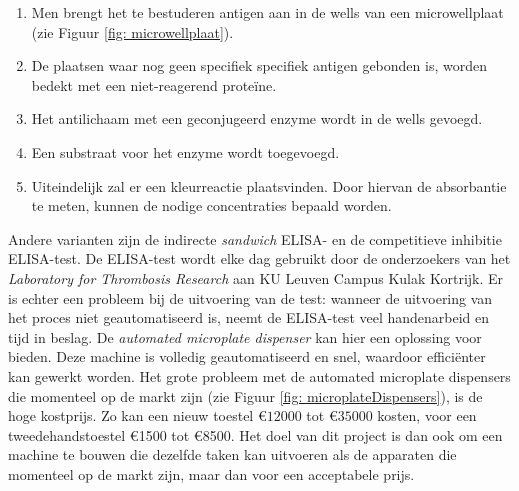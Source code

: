 \documentclass[a4paper,twoside,kulak]{kulakreport} %
\begin{document}
\begin{enumerate}
	\item Men brengt het te bestuderen antigen aan in de wells van een microwellplaat (zie Figuur \ref{fig: microwellplaat}).
	\item De plaatsen waar nog geen specifiek specifiek antigen gebonden is, worden bedekt met een niet-reagerend proteïne.
	\item Het antilichaam met een geconjugeerd enzyme wordt in de wells gevoegd.
	\item Een substraat voor het enzyme wordt toegevoegd. 
	\item Uiteindelijk zal er een kleurreactie plaatsvinden. Door hiervan de absorbantie te meten, kunnen de nodige concentraties bepaald worden. 
\end{enumerate}
Andere varianten zijn de indirecte \textit{sandwich} ELISA- en de competitieve inhibitie ELISA-test\cite{soortenELISA1}\cite{soortenELISA2}\cite{soortenELISA3}.
De ELISA-test wordt elke dag gebruikt door de onderzoekers van het \textit{Laboratory for Thrombosis Research} aan KU Leuven Campus Kulak Kortrijk. Er is echter een probleem bij de uitvoering van de test: wanneer de uitvoering van het proces niet geautomatiseerd is, neemt de ELISA-test veel handenarbeid en tijd in beslag. De \textit{automated microplate dispenser} kan hier een oplossing voor bieden. Deze machine is volledig geautomatiseerd en snel, waardoor efficiënter kan gewerkt worden. 
\newline
Het grote probleem met de automated microplate dispensers die momenteel op de markt zijn (zie Figuur \ref{fig: microplateDispensers}), is de hoge kostprijs. Zo kan een nieuw toestel  \euro $12000$ tot \euro $35000$\cite{BioSPX} kosten, voor een tweedehandstoestel \euro 1500 tot \euro 8500\cite{LabX}. Het doel van dit project is dan ook om een machine te bouwen die dezelfde taken kan uitvoeren als de apparaten die momenteel op de markt zijn, maar dan voor een acceptabele prijs.
\end{document}
